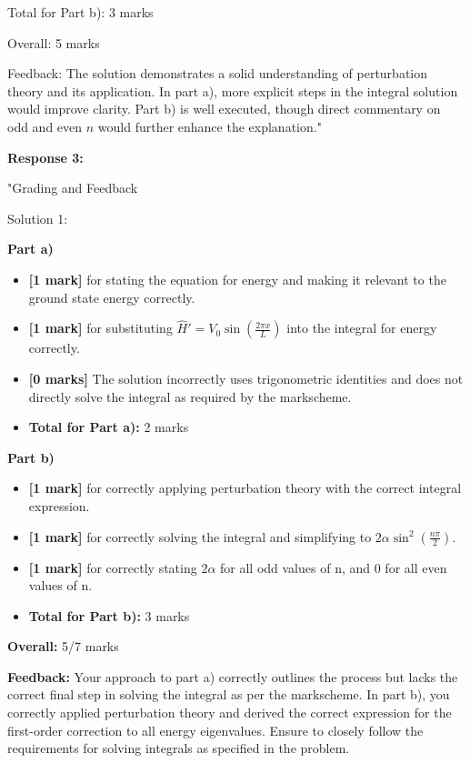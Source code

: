 \documentclass[a4paper,11pt]{article}
\begin{document}
Total for Part b): 3 marks

Overall: 5 marks

Feedback: The solution demonstrates a solid understanding of perturbation theory and its application. In part a), more explicit steps in the integral solution would improve clarity. Part b) is well executed, though direct commentary on odd and even \(n\) would further enhance the explanation."

\textbf{Response 3:}

"Grading and Feedback

Solution 1:

\textbf{Part a)}
\begin{itemize}
    \item \textbf{[1 mark]} for stating the equation for energy and making it relevant to the ground state energy correctly.
    \item \textbf{[1 mark]} for substituting \( \hat{H}' = V_{0} \sin\left(\frac{2 \pi x}{L} \right) \) into the integral for energy correctly.
    \item \textbf{[0 marks]} The solution incorrectly uses trigonometric identities and does not directly solve the integral as required by the markscheme.
    \item \textbf{Total for Part a):} 2 marks
\end{itemize}

\textbf{Part b)}
\begin{itemize}
    \item \textbf{[1 mark]} for correctly applying perturbation theory with the correct integral expression.
    \item \textbf{[1 mark]} for correctly solving the integral and simplifying to \(2 \alpha \sin^{2}\left(\frac{n \pi}{2} \right)\).
    \item \textbf{[1 mark]} for correctly stating \(2 \alpha \) for all odd values of n, and 0 for all even values of n.
    \item \textbf{Total for Part b):} 3 marks
\end{itemize}

\textbf{Overall:} 5/7 marks

\textbf{Feedback:} Your approach to part a) correctly outlines the process but lacks the correct final step in solving the integral as per the markscheme. In part b), you correctly applied perturbation theory and derived the correct expression for the first-order correction to all energy eigenvalues. Ensure to closely follow the requirements for solving integrals as specified in the problem.
\end{document}
